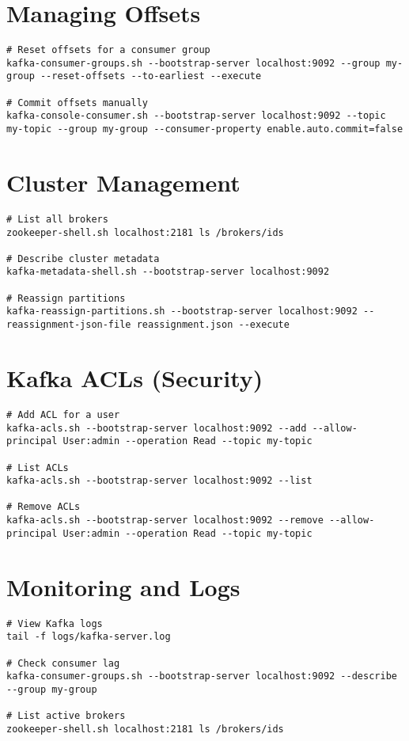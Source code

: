 \documentclass[11pt]{article}
\begin{document}
    \section*{Managing Offsets}
    \begin{lstlisting}[style=kafkaStyle]
# Reset offsets for a consumer group
kafka-consumer-groups.sh --bootstrap-server localhost:9092 --group my-group --reset-offsets --to-earliest --execute

# Commit offsets manually
kafka-console-consumer.sh --bootstrap-server localhost:9092 --topic my-topic --group my-group --consumer-property enable.auto.commit=false
    \end{lstlisting}

    \section*{Cluster Management}
    \begin{lstlisting}[style=kafkaStyle]
# List all brokers
zookeeper-shell.sh localhost:2181 ls /brokers/ids

# Describe cluster metadata
kafka-metadata-shell.sh --bootstrap-server localhost:9092

# Reassign partitions
kafka-reassign-partitions.sh --bootstrap-server localhost:9092 --reassignment-json-file reassignment.json --execute
    \end{lstlisting}

    \section*{Kafka ACLs (Security)}
    \begin{lstlisting}[style=kafkaStyle]
# Add ACL for a user
kafka-acls.sh --bootstrap-server localhost:9092 --add --allow-principal User:admin --operation Read --topic my-topic

# List ACLs
kafka-acls.sh --bootstrap-server localhost:9092 --list

# Remove ACLs
kafka-acls.sh --bootstrap-server localhost:9092 --remove --allow-principal User:admin --operation Read --topic my-topic
    \end{lstlisting}

    \section*{Monitoring and Logs}
    \begin{lstlisting}[style=kafkaStyle]
# View Kafka logs
tail -f logs/kafka-server.log

# Check consumer lag
kafka-consumer-groups.sh --bootstrap-server localhost:9092 --describe --group my-group

# List active brokers
zookeeper-shell.sh localhost:2181 ls /brokers/ids
    \end{lstlisting}
\end{document}
